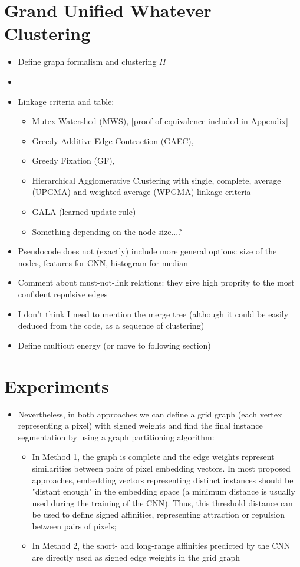 \documentclass[10pt,twocolumn,letterpaper]{article}
\newcommand\TODO[1]{{\color{red}{TODO: #1}}}
\begin{document}
\section{Grand Unified Whatever Clustering}
\begin{itemize}
\item Define graph formalism and clustering $\Pi$
\item \TODO{Description of the algorithm}
\item Linkage criteria and table:
\begin{itemize}
\item Mutex Watershed (MWS), [proof of equivalence included in Appendix]
\item Greedy Additive Edge Contraction (GAEC), 
\item Greedy Fixation (GF), 
\item Hierarchical Agglomerative Clustering with single, complete, average (UPGMA) and weighted average (WPGMA) linkage criteria
\item GALA (learned update rule)
\item Something depending on the node size...?
\end{itemize}
\item Pseudocode does not (exactly) include more general options: size of the nodes, features for CNN, histogram for median \TODO{But I think I should keep it simple}
\item Comment about must-not-link relations: they give high proprity to the most confident repulsive edges \item I don't think I need to mention the merge tree (although it could be easily deduced from the code, as a sequence of clustering)
\item Define multicut energy (or move to following section)
\end{itemize}


\section{Experiments}
\begin{itemize}
\item Nevertheless, in both approaches we can define a grid graph (each vertex representing a pixel) with signed weights and find the final instance segmentation by using a graph partitioning algorithm:
\begin{itemize}
\item In Method 1, the graph is complete and the edge weights represent similarities between pairs of pixel embedding vectors. In most proposed approaches, embedding vectors representing distinct instances should be "distant enough" in the embedding space (a minimum distance is usually used during the training of the CNN). Thus, this threshold distance can be used to define signed affinities, representing attraction or repulsion between pairs of pixels;
\item  In Method 2, the short- and long-range affinities predicted by the CNN are directly used as signed edge weights in the grid graph
\end{itemize}
\end{itemize}
\end{document}
